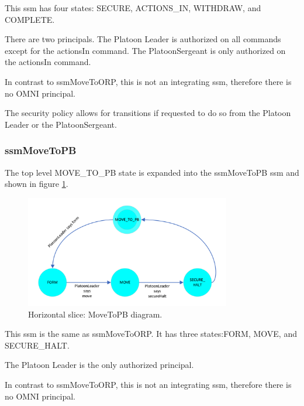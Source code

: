 \documentclass[../../main/main.tex]{subfiles}
\begin{document}

This \gls{ssm} has four states: SECURE, ACTIONS_IN, WITHDRAW, and COMPLETE.  

There are two principals.  The Platoon Leader is authorized on all commands except for the actionsIn command.  The PlatoonSergeant is only authorized on the actionsIn command.

In contrast to ssmMoveToORP, this is not an integrating \gls{ssm}, therefore there is no OMNI principal.  

The security policy allows for transitions if requested to do so from the Platoon Leader or the PlatoonSergeant.  

\clearpage

\subsubsection{ssmMoveToPB}\label{sssec:ssmMoveToPB}
The top level MOVE_TO_PB state is expanded into the ssmMoveToPB \gls{ssm} and shown in figure \ref{ssmMoveToPBDiagram}.

\begin{figure}[h!]
\centering
\includegraphics[width=0.8\textwidth]{../figures/ssmMoveToPBDiagram}
\caption{\label{ssmMoveToPBDiagram} Horizontal slice: MoveToPB diagram.}
\end{figure}

This \gls{ssm} is the same as ssmMoveToORP.  It has three states:FORM, MOVE, and SECURE_HALT.  

The Platoon Leader is the only authorized principal.  

In contrast to ssmMoveToORP, this is not an integrating \gls{ssm}, therefore there is no OMNI principal.  
\end{document}
